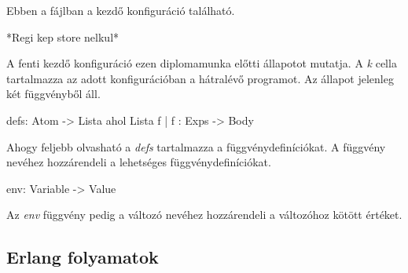 Ebben a fájlban a kezdő konfiguráció található.

*Regi kep store nelkul*

A fenti kezdő konfiguráció ezen diplomamunka előtti állapotot mutatja. A \textit{k} cella tartalmazza az adott konfigurációban a hátralévő programot. Az állapot jelenleg két függvényből áll. 

defs: Atom -> Lista ahol Lista {f | f : Exps -> Body}

Ahogy feljebb olvasható a \textit{defs} tartalmazza a függvénydefiníciókat. A függvény nevéhez hozzárendeli a lehetséges függvénydefiníciókat.

env: Variable -> Value

Az \textit{env} függvény pedig a változó nevéhez hozzárendeli a változóhoz kötött értéket.


\subsection{Erlang folyamatok}